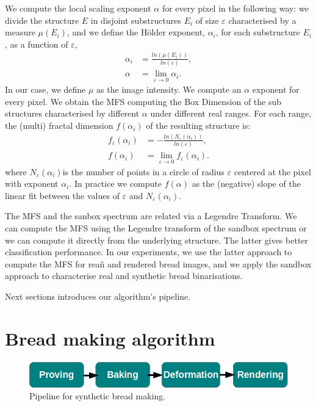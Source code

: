 \documentclass[final,5p,times]{elsarticle}
\begin{document}
We compute the local scaling exponent $\alpha$ for every pixel in the following way: we divide the structure $E$ in disjoint substructures $E_{i}$ of size $\varepsilon$ characterised by a measure $\mu(E_{i})$, and we define the H\"older exponent, $\alpha_{i}$, for each substructure $E_{i}$, as a function of $\varepsilon$, 
 \begin{align}
\alpha_{i} &= \frac{ln(\mu(E_{i}))}{ln(\varepsilon)},\\
\alpha &= \lim_{\varepsilon\to0}{\alpha_{i}}.
\label{eqn:eqn4}
\end{align}
In our case, we define $\mu$ as the image intensity. We compute an $\alpha$ exponent for every pixel. We obtain the MFS computing the Box Dimension of the sub structures characterised by different $\alpha$ under different real ranges. For each range, the (multi) fractal dimension $f(\alpha_{i})$ of the resulting structure is:
\begin{align}
f_{\varepsilon}(\alpha_{i}) &= - \frac{ln(N_{\varepsilon}(\alpha_{i}))}{ln(\varepsilon)},\\
f(\alpha_{i}) &= \lim_{\varepsilon\to0}{f_{\varepsilon}(\alpha_{i})}.
\end{align}
\noindent where $N_{\varepsilon}(\alpha_{i})$is the number of points in a circle of radius $\varepsilon$ centered at the pixel with exponent $\alpha_{i}$. In practice we compute $f(\alpha)$ as the (negative) slope of the linear fit between the values of $\varepsilon$ and $N_{\varepsilon}(\alpha_{i})$.

The MFS and the sanbox spectrum are related via a Legendre Transform. We can compute the MFS using the Legendre transform of the sandbox spectrum or we can compute it directly from the underlying structure. The latter gives better classification performance. In our experiments, we use the latter approach to compute the MFS for reañ and rendered bread images, and we apply the sandbox approach to characterise real and synthetic bread binarisations.

Next sections introduces our algorithm's pipeline.




\section{Bread making algorithm}

\begin{figure}
\includegraphics[scale=0.45]{pipeline.png}
\caption{Pipeline for synthetic bread making.}
\label{FigPipeline}
\end{figure}
\end{document}
